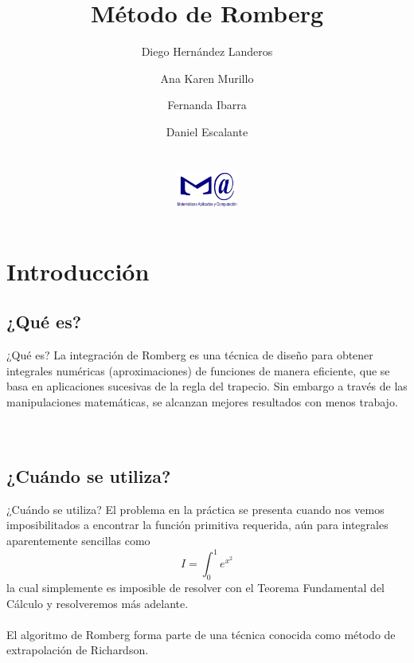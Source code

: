 \documentclass{beamer}
\title[Métodos Numéricos II]
{Método de Romberg}
\author[MAC]{Diego Hernández Landeros\\ \and Ana Karen Murillo \\\and Fernanda Ibarra \\\and Daniel Escalante\\
\\$\,$\\
\centering
\includegraphics[width=2cm]{mac.png}
}
\institute[]{
UNAM-FES Acatlán, Matemáticas Aplicadas y Computación}
\begin{document}
\begin{frame}
  \titlepage
\end{frame}

\section{Introducción}
\subsection{¿Qué es?}

\begin{frame}{¿Qué es?}
La integración de Romberg es una \alert{técnica} de diseño para obtener integrales numéricas \alert{(aproximaciones)} de funciones de manera eficiente, que se basa en aplicaciones sucesivas de \alert{la regla del trapecio}. Sin embargo a través de las manipulaciones matemáticas, se alcanzan mejores resultados con menos trabajo.\\
\\$\,$\\ %

\end{frame}

\subsection{¿Cuándo se utiliza?}
    \begin{frame}{¿Cuándo se utiliza?}
El problema en la práctica se presenta cuando nos vemos imposibilitados a encontrar la
función primitiva requerida, aún para integrales aparentemente sencillas como\\
{\small \[I=\int_{0}^{1}e^{x^{2}}\]}
la cual simplemente es imposible de resolver con el Teorema Fundamental del Cálculo y resolveremos más adelante.
\\$\,$\\
El algoritmo de Romberg forma parte de una técnica conocida como método de extrapolación de Richardson.
\end{frame}

\end{document}
